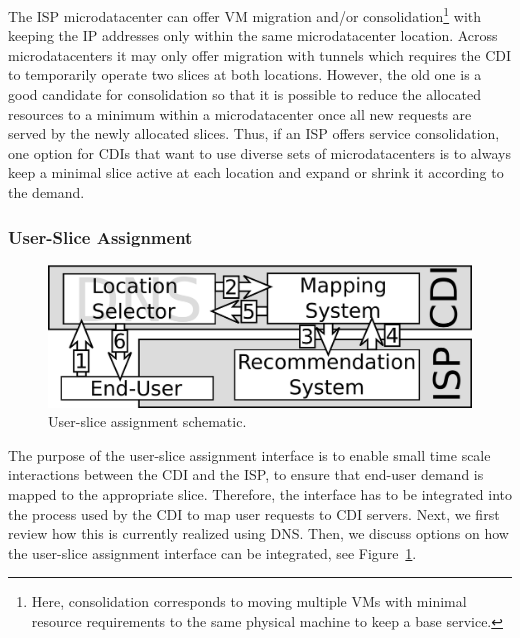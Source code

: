 The ISP microdatacenter can offer VM migration and/or
consolidation\footnote{Here, consolidation corresponds to moving multiple VMs
with minimal resource requirements to the same physical machine to keep a base
service.} with keeping the IP addresses only within the same microdatacenter
location. Across microdatacenters it may only offer migration with tunnels
which requires the CDI to temporarily operate two slices at both locations.
However, the old one is a good candidate for consolidation so that it is
possible to reduce the allocated resources to a minimum within a
microdatacenter once all new requests are served by the newly allocated slices.
Thus, if an ISP offers service consolidation, one option for CDIs that want to
use diverse sets of microdatacenters is to always keep a minimal slice active
at each location and expand or shrink it according to the demand.

\subsubsection{User-Slice Assignment}\label{sec:system-user-assignment}

\begin{figure}[tbp]
    \begin{center}
    \includegraphics[width=0.8\linewidth]{figures-pdf/Mapping_System}
    \end{center}
    \vspace*{-1em}
    \caption{User-slice assignment schematic.}
    \label{fig:UserSliceAllocation}
\end{figure}

The purpose of the user-slice assignment interface is to enable small time
scale interactions between the CDI and the ISP, to ensure that end-user demand
is mapped to the appropriate slice.  Therefore, the interface has to be
integrated into the process used by the CDI to map user requests to CDI
servers.  Next, we first review how this is currently realized using DNS. Then,
we discuss options on how the user-slice assignment interface can be
integrated, see Figure~\ref{fig:UserSliceAllocation}.


